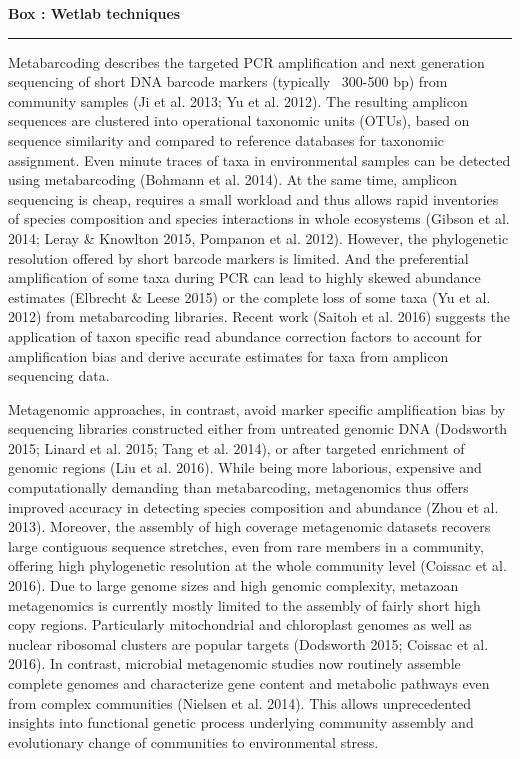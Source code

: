 \documentclass[12pt]{article}
\newcounter{Box}
\begin{document}
\noindent
\colorbox{gray!20}{
  \begin{minipage}{0.97\textwidth}
    \label{box:lab}
    \noindent
    {\bf \large Box \theBox: Wetlab techniques} 
    \vspace{1pt}
    \hrule
    \vspace{1pt}
    
    Metabarcoding describes the targeted PCR amplification and next
    generation sequencing of short DNA barcode markers (typically
    ~300-500 bp) from community samples (Ji et al. 2013; Yu et
    al. 2012). The resulting amplicon sequences are clustered into
    operational taxonomic units (OTUs), based on sequence similarity
    and compared to reference databases for taxonomic assignment. Even
    minute traces of taxa in environmental samples can be detected
    using metabarcoding (Bohmann et al. 2014). At the same time,
    amplicon sequencing is cheap, requires a small workload and thus
    allows rapid inventories of species composition and species
    interactions in whole ecosystems (Gibson et al. 2014; Leray \&
    Knowlton 2015, Pompanon et al. 2012). However, the phylogenetic
    resolution offered by short barcode markers is limited. And the
    preferential amplification of some taxa during PCR can lead to
    highly skewed abundance estimates (Elbrecht \& Leese 2015) or the
    complete loss of some taxa (Yu et al. 2012) from metabarcoding
    libraries. Recent work (Saitoh et al. 2016) suggests the
    application of taxon specific read abundance correction factors to
    account for amplification bias and derive accurate estimates for
    taxa from amplicon sequencing data.  

    Metagenomic approaches, in contrast, avoid marker specific
    amplification bias by sequencing libraries constructed either from
    untreated genomic DNA (Dodsworth 2015; Linard et al. 2015; Tang et
    al. 2014), or after targeted enrichment of genomic regions (Liu et
    al. 2016). While being more laborious, expensive and
    computationally demanding than metabarcoding, metagenomics thus
    offers improved accuracy in detecting species composition and
    abundance (Zhou et al. 2013). Moreover, the assembly of high
    coverage metagenomic datasets recovers large contiguous sequence
    stretches, even from rare members in a community, offering high
    phylogenetic resolution at the whole community level (Coissac et
    al. 2016). Due to large genome sizes and high genomic complexity,
    metazoan metagenomics is currently mostly limited to the assembly
    of fairly short high copy regions. Particularly mitochondrial and
    chloroplast genomes as well as nuclear ribosomal clusters are
    popular targets (Dodsworth 2015; Coissac et al. 2016). In
    contrast, microbial metagenomic studies now routinely assemble
    complete genomes and characterize gene content and metabolic
    pathways even from complex communities (Nielsen et al. 2014). This
    allows unprecedented insights into functional genetic process
    underlying community assembly and evolutionary change of
    communities to environmental stress.
  \end{minipage}
}
\end{document}
